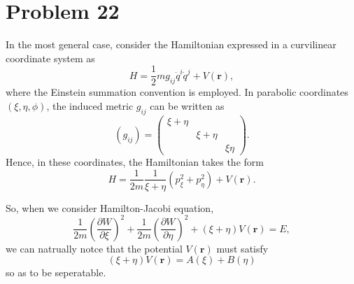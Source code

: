 \section*{Problem 22}   

    In the most general case, consider the Hamiltonian expressed in a curvilinear coordinate system as
    \begin{equation*}
        H = \frac{1}{2} m g_{ij} \dot{q}^i \dot{q}^j  +  V\left(\boldsymbol{r}\right),
    \end{equation*}
    where the Einstein summation convention is employed. In parabolic coordinates $(\xi, \eta, \phi)$, the induced metric $g_{ij}$ can be written as
    \begin{equation}
        \left(g_{ij}\right)  = \left(
        \begin{matrix}
            \xi + \eta  &               &           \\
                        & \xi + \eta    &           \\
                        &               &  \xi\eta
        \end{matrix}
        \right).
    \end{equation}
    Hence, in these coordinates, the Hamiltonian takes the form
    \begin{equation}
        H = \frac{1}{2m} \frac{1}{\xi+\eta} \left( p_\xi^2 + p_\eta^2 \right)  +  V\left(\boldsymbol{r}\right).
    \end{equation}

    So, when we consider Hamilton-Jacobi equation,
    \begin{equation}
        \frac{1}{2m} \left(\frac{\partial W}{\partial\xi}\right)^2 + \frac{1}{2m} \left(\frac{\partial W}{\partial\eta}\right)^2  +  \left(\xi+\eta\right)V\left(\boldsymbol{r}\right) = E,
    \end{equation}
    we can natrually notce that the potential $V\left(\boldsymbol{r}\right)$ must satisfy
    \begin{equation}
        \left(\xi+\eta\right)V\left(\boldsymbol{r}\right) = A\left(\xi\right) + B\left(\eta\right)
    \end{equation}
    so as to be seperatable.
